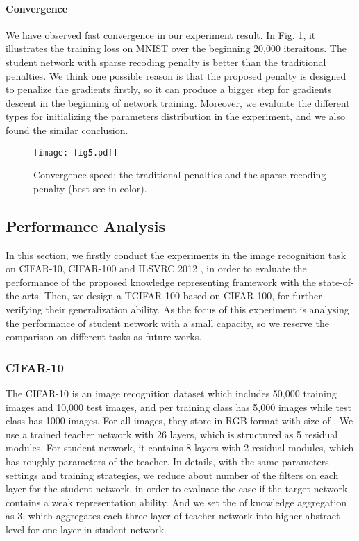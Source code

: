 \documentclass[10pt,twocolumn,letterpaper]{article}
\begin{document}
\paragraph{Convergence}
We have observed fast convergence in our experiment result.
In Fig. \ref{fig:analysis_convergence},
it illustrates the training loss on MNIST over the beginning 20,000 iteraitons.
The student network with sparse recoding penalty
is better than the traditional penalties.
We think one possible reason is that
the proposed penalty is designed to penalize the gradients firstly,
so it can produce a bigger step for gradients descent
in the beginning of network training.
Moreover,
we evaluate the different types for initializing the parameters distribution in the experiment,
and we also found the similar conclusion.


\begin{figure}[b]
  \centering
  \texttt{[image: fig5.pdf]}
  \caption{Convergence speed; the traditional penalties \cite{wen2016learning, zhang2016l1} and the sparse recoding penalty (best see in color).}                                                \label{fig:analysis_convergence}
\end{figure}

\subsection{Performance Analysis}\label{sec_performance_analysis}
In this section,
we firstly conduct the experiments
in the image recognition task
on CIFAR-10, CIFAR-100 \cite{Krizhevsky2009} and ILSVRC 2012 \cite{Deng2009},
in order to evaluate the performance of
the proposed knowledge representing framework with the state-of-the-arts.
Then,
we design a TCIFAR-100 based on CIFAR-100,
for further verifying their generalization ability.
As the focus of this experiment is analysing
the performance of student network with a small capacity,
so we reserve the comparison on different tasks as future works.

\subsubsection{CIFAR-10}
The CIFAR-10 is an image recognition dataset \cite{Krizhevsky2009}
which includes 50,000 training images and 10,000 test images,
and per training class has 5,000 images while test class has 1000 images.
For all images, they store in RGB format with size of .
We use a trained teacher network with 26 layers,
which is structured as 5 residual modules.
For student network,
it contains 8 layers with 2 residual modules,
which has roughly  parameters of the teacher.
In details,
with the same parameters settings and training strategies,
we reduce about  number of the filters on each layer for the student network,
in order to evaluate the case if the target network contains a weak representation ability.
And we set the  of knowledge aggregation as 3,
which aggregates each three layer of teacher network into higher abstract level
for one layer in student network.
\end{document}
